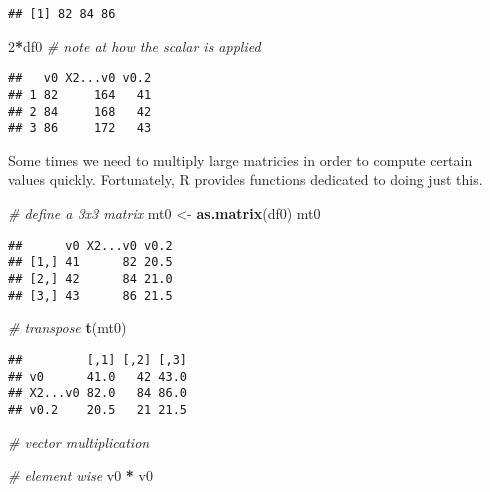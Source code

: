 \documentclass[]{article}
\newenvironment{Shaded}{\begin{snugshade}}{\end{snugshade}}
\newcommand{\CommentTok}[1]{\textcolor[rgb]{0.56,0.35,0.01}{\textit{#1}}}
\newcommand{\DecValTok}[1]{\textcolor[rgb]{0.00,0.00,0.81}{#1}}
\newcommand{\KeywordTok}[1]{\textcolor[rgb]{0.13,0.29,0.53}{\textbf{#1}}}
\newcommand{\NormalTok}[1]{#1}
\newcommand{\OperatorTok}[1]{\textcolor[rgb]{0.81,0.36,0.00}{\textbf{#1}}}
\newcommand{\StringTok}[1]{\textcolor[rgb]{0.31,0.60,0.02}{#1}}
\begin{document}
\begin{verbatim}
## [1] 82 84 86
\end{verbatim}

\begin{Shaded}
\begin{Highlighting}[]
\DecValTok{2}\OperatorTok{*}\NormalTok{df0 }\CommentTok{# note at how the scalar is applied }
\end{Highlighting}
\end{Shaded}

\begin{verbatim}
##   v0 X2...v0 v0.2
## 1 82     164   41
## 2 84     168   42
## 3 86     172   43
\end{verbatim}

Some times we need to multiply large matricies in order to compute
certain values quickly. Fortunately, R provides functions dedicated to
doing just this.

\begin{Shaded}
\begin{Highlighting}[]
\CommentTok{# define a 3x3 matrix}
\NormalTok{mt0 <-}\StringTok{ }\KeywordTok{as.matrix}\NormalTok{(df0)}
\NormalTok{mt0}
\end{Highlighting}
\end{Shaded}

\begin{verbatim}
##      v0 X2...v0 v0.2
## [1,] 41      82 20.5
## [2,] 42      84 21.0
## [3,] 43      86 21.5
\end{verbatim}

\begin{Shaded}
\begin{Highlighting}[]
\CommentTok{# transpose}
\KeywordTok{t}\NormalTok{(mt0)}
\end{Highlighting}
\end{Shaded}

\begin{verbatim}
##         [,1] [,2] [,3]
## v0      41.0   42 43.0
## X2...v0 82.0   84 86.0
## v0.2    20.5   21 21.5
\end{verbatim}

\begin{Shaded}
\begin{Highlighting}[]
\CommentTok{# vector multiplication }

\CommentTok{# element wise }
\NormalTok{v0 }\OperatorTok{*}\StringTok{ }\NormalTok{v0 }
\end{Highlighting}
\end{Shaded}
\end{document}
